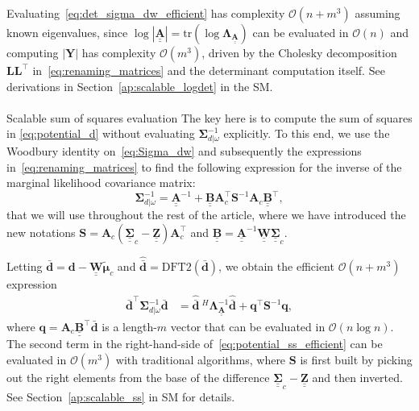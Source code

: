 \documentclass[12pt]{article}
\makeatletter
\let\oldparagraph\paragraph
\renewcommand{\paragraph}{
    \@ifstar
      \xxxParagraphStar
      \xxxParagraphNoStar
  }
\newcommand{\xxxParagraphStar}[1]{\oldparagraph*{#1}\mbox{}}
\newcommand{\xxxParagraphNoStar}[1]{\oldparagraph{#1}\mbox{}}
\newcommand{\mybcirc}[1] {\underline{\underline{\bm{#1}}}}
\makeatother
\begin{document}
Evaluating~\eqref{eq:det_sigma_dw_efficient} has complexity $\mathcal{O}(n + m^3)$ assuming known eigenvalues, since $\log |\mybcirc{A}| = \mbox{tr}(\log \bm{\Lambda}_{\mybcirc{A}})$ can be evaluated in $\mathcal{O}(n)$ and 
computing $|\bm{Y}|$ has complexity $\mathcal{O}(m^3)$, driven by the Cholesky decomposition $\bm{L}\bm{L}^\top$ in~\eqref{eq:renaming_matrices} and the determinant computation itself.
See derivations in Section~\ref{ap:scalable_logdet} in the SM.

\paragraph{Scalable sum of squares evaluation} \label{sec:ss_likelihood}
The key here is to compute the sum of squares in \eqref{eq:potential_d} without evaluating $\bm{\Sigma}_{d|\omega}^{-1}$ explicitly.
To this end, we use the Woodbury identity on~\eqref{eq:Sigma_dw} and subsequently the expressions in~\eqref{eq:renaming_matrices} to find the following expression for the inverse of the marginal likelihood covariance matrix:
\begin{equation} \label{eq:inverse_covariance_collapsed_efficient}
    \bm{\Sigma}_{d|\omega}^{-1} = \mybcirc{A}^{-1} + \mybcirc{B} \bm{A}_c^{\top} \bm{S}^{-1} \bm{A}_c \mybcirc{B}^{\top},
\end{equation}
that we will use throughout the rest of the article,
where we have introduced the new notations $\bm{S} =\bm{A}_c (\mybcirc{\Sigma}_{c} - \mybcirc{Z})\bm{A}_c^{\top}$ and $\mybcirc{B} = \mybcirc{A}^{-1} \mybcirc{W} \mybcirc{\Sigma}_c$. 

Letting $\bar{\bm{d}} = \bm{d} - \mybcirc{W} \tilde{\bm{\mu}}_c$ and $\hat{\bar{\bm{d}}} = \mbox{DFT2}(\bar{\bm{d}})$, we obtain the efficient $\mathcal{O}(n+m^3)$ expression
\begin{equation}\label{eq:potential_ss_efficient}
\begin{split}
    \bar{\bm{d}}^{\top} \bm{\Sigma}_{d|\omega}^{-1} \bar{\bm{d}}
    &= \hat{\bar{\bm{d}}}\:^{H} \bm{\Lambda}_{\mybcirc{A}}^{-1} \hat{\bar{\bm{d}}}
    + \bm{q}^{\top} \bm{S}^{-1} \bm{q}, 
\end{split}
\end{equation}
where $\bm{q} = \bm{A}_c \mybcirc{B}^{\top} \bar{\bm{d}}$ is a length-$m$ vector that can be evaluated in $\mathcal{O}(n \log n)$.
The second term in the right-hand-side of~\eqref{eq:potential_ss_efficient} can be evaluated in $\mathcal{O}(m^3)$ with traditional algorithms, where 
$\bm{S}$ is first built by picking out the right elements from the base of the difference $\mybcirc{\Sigma}_c - \mybcirc{Z}$ and then inverted. See Section~\ref{ap:scalable_ss} in SM for details.
\end{document}
